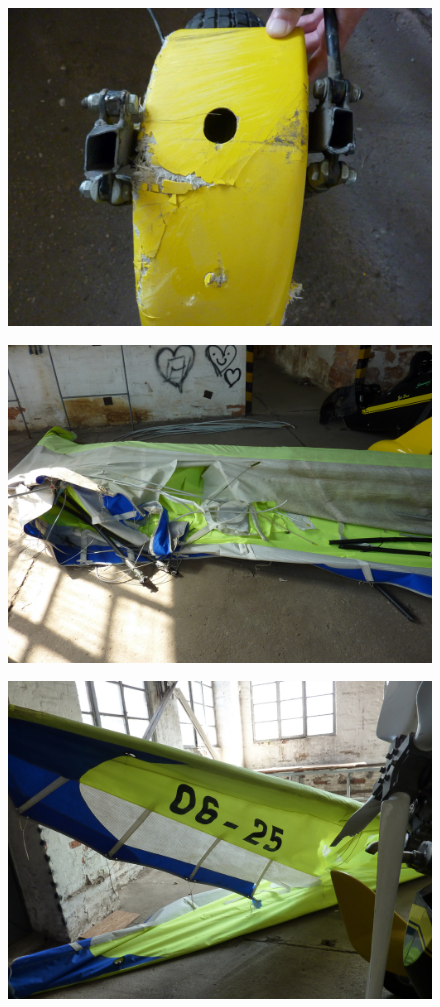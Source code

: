 \documentclass[a4paper,10pt]{article}
\begin{document}
\begin{figure}[ht!]
\centering
\includegraphics[width=13cm]{kepek/KJ3}
\end{figure}
\begin{figure}[ht!]
\centering
\includegraphics[width=13cm]{kepek/KJ2}
\end{figure}
\begin{figure}[ht!]
\centering
\includegraphics[width=13cm]{kepek/KJ4}
\end{figure}
\end{document}
